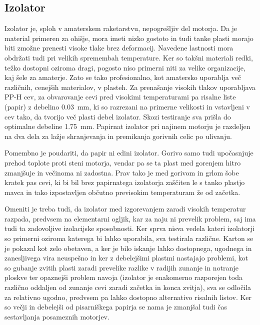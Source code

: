 \documentclass[titlepage, a4paper, twoside, final, 12pt]{article}
\begin{document}
			\subsection{Izolator}
			Izolator je, sploh v amaterskem raketarstvu, nepogrešljiv del motorja. Da je material primeren za ohišje, mora imeti nizko gostoto
			in tudi tanke plasti morajo biti zmožne prenesti visoke tlake brez deformacij. Navedene lastnosti mora obdržati tudi pri velikih spremembah temperature.
			Ker so takšni materiali redki, težko dostopni oziroma dragi, pogosto niso primerni niti za velike organizacije,
			kaj šele za amaterje. Zato se tako profesionalno, kot amatersko uporablja več različnih, cenejših materialov, v plasteh. Za prenašanje visokih tlakov uporabljava PP-H cev,
			za obvarovanje cevi pred visokimi temperaturami pa risalne liste (papir) z debelino \SI{0,03}{mm}, ki so razrezani na primerne velikosti in vstavljeni v cev
			tako, da tvorijo več plasti debel izolator.\cite{Thermal_conductivity_of_Paper} Skozi testiranje sva prišla do optimalne debeline \SI{1,75}{mm}. 
			Papirnat izolator pri najinem motorju je razdeljen na dva dela za lažje shranjevanja 
			in premikanja gorivnih celic po ulivanju. 

			Pomembno je poudariti, da papir ni edini izolator. Gorivo samo tudi upočasnjuje prehod toplote proti steni motorja,
			vendar pa se ta plast med gorenjem hitro zmanjšuje in večinoma ni zadostna.
			Prav tako je med gorivom in grlom šobe kratek pas cevi, ki bi bil brez papirnatega izolatorja zaščiten le s tanko plastjo mavca in tako izpostavljen
			občutno previsokim temperaturam že od začetka.

			Omeniti je treba tudi, da izolator med izgorevanjem zaradi visokih temperatur razpada, predvsem na elementarni ogljik, kar za naju ni prevelik problem,
			saj ima tudi ta zadovoljive izolacijske sposobnosti.\cite{Thermal_conductivity_of_Carbon}
			Ker sprva nisva vedela kateri izolatorji so primerni oziroma katerega bi lahko uporabila, sva testirala različne. Karton se je pokazal kot zelo obetaven,
			a ker je bilo iskanje lahko dostopnega, ugodnega in zanesljivega vira neuspešno in ker z debelejšimi plastmi nastajajo problemi, kot so gubanje zvitih plasti zaradi prevelike razlike
			v radijih zunanje in notranje ploskve ter opaznejši problem navoja (izolator je enakomerno razporejen toda različno oddaljen od zunanje cevi zaradi začetka in konca zvitja), 
			sva se odločila za relativno ugodno, predvsem pa lahko dostopno alternativo risalnih listov. Ker so večji in debelejši od pisarniškega papirja se nama
			je zmanjšal tudi čas sestavljanja posameznih motorjev.
\end{document}

